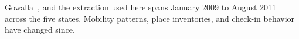 \begin{enumerate}
    Gowalla~\cite{cho2011gowalla}, and the extraction used here spans January 2009
    to August 2011 across the five states. Mobility patterns, place inventories,
    and check-in behavior have changed since.

\end{enumerate}
